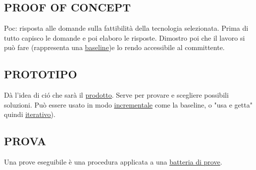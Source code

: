 		\subsection{PROOF OF CONCEPT}	 \label{poc}
		Poc: risposta alle domande sulla fattibilità  della tecnologia selezionata. Prima di tutto capisco le domande e poi elaboro le risposte. Dimostro poi che il lavoro si può fare (rappresenta una \underline{\hyperref[baseline]{baseline}})e lo rendo accessibile al committente.

		\subsection{PROTOTIPO}  \label{prototipo}
		Dà l'idea di ció che sarà il \underline{\hyperref[prodotto]{prodotto}}. Serve per provare e scegliere possibili soluzioni. Può essere usato in modo \underline{\hyperref[incremento]{incrementale}} come la baseline, o "usa e getta" quindi \underline{\hyperref[iterazione]{iterativo}}).

		\subsection{PROVA}		\label{prova} %
		Una prove eseguibile è una procedura applicata a una \underline{\hyperref[testsuite]{batteria di prove}}.

